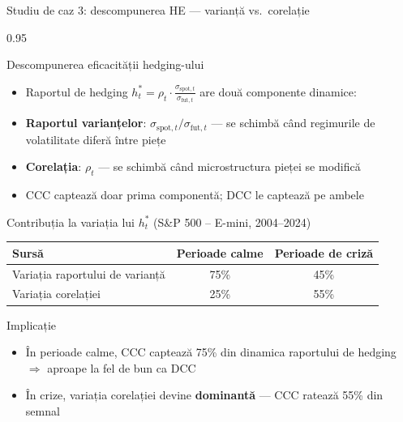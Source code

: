 \documentclass[9pt, aspectratio=169, t]{beamer}
\begin{document}
\begin{frame}{Studiu de caz 3: descompunerea HE --- varianță vs.\ corelație}
    \begin{cminipage}{0.95\textwidth}
    {\footnotesize
    \begin{block}{Descompunerea eficacității hedging-ului}
        \begin{itemize}\setlength{\itemsep}{0pt}
            \item Raportul de hedging $h_t^* = \rho_t \cdot \frac{\sigma_{\text{spot},t}}{\sigma_{\text{fut},t}}$ are două componente dinamice:
            \item \textbf{Raportul varianțelor}: $\sigma_{\text{spot},t} / \sigma_{\text{fut},t}$ --- se schimbă când regimurile de volatilitate diferă între piețe
            \item \textbf{Corelația}: $\rho_t$ --- se schimbă când microstructura pieței se modifică
            \item CCC captează doar prima componentă; DCC le captează pe ambele
        \end{itemize}
    \end{block}
    \vspace{-2mm}
    \begin{block}{Contribuția la variația lui $h_t^*$ (S\&P 500 -- E-mini, 2004--2024)}
        {\small
        \begin{center}
        \begin{tabular}{l|cc}
            \hline
            \textbf{Sursă} & \textbf{Perioade calme} & \textbf{Perioade de criză} \\
            \hline
            Variația raportului de varianță & 75\% & 45\% \\
            Variația corelației             & 25\% & 55\% \\
            \hline
        \end{tabular}
        \end{center}
        }
    \end{block}
    \vspace{-2mm}
    \begin{alertblock}{Implicație}
        \begin{itemize}\setlength{\itemsep}{0pt}
            \item În perioade calme, CCC captează 75\% din dinamica raportului de hedging $\Rightarrow$ aproape la fel de bun ca DCC
            \item În crize, variația corelației devine \textbf{dominantă} --- CCC ratează 55\% din semnal
        \end{itemize}
    \end{alertblock}
    }
    \end{cminipage}
\end{frame}
\end{document}
